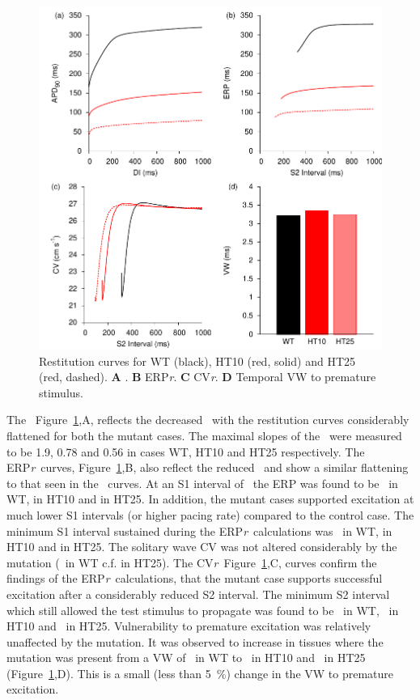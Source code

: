 \begin{figure}
\includegraphics{figures/atrium/iks/figures/03_REST}
\caption[Restitution properties with S140G mutation]{
\label{atrium:iks:apdretal}
Restitution curves for WT (black), HT10 (red, solid) and HT25 (red, dashed).
\textbf{A} \apdr.
\textbf{B} ERP\emph{r}.
\textbf{C} CV\emph{r}.
\textbf{D} Temporal VW to premature stimulus.
}
\end{figure}

The \apdr\, Figure~\ref{atrium:iks:apdretal},A, reflects the decreased \apd\ with
the restitution curves considerably flattened for both the mutant cases.
The maximal slopes of the \apdr\ were measured to be 1.9, 0.78 and 0.56 in cases
WT, HT10 and HT25 respectively.
The ERP\emph{r}\ curves, Figure~\ref{atrium:iks:apdretal},B, also reflect the
reduced \apd\ and show a similar flattening to that seen in the \apdr\ curves.
At an S1 interval of \ the ERP was found to be \ in WT,
 in HT10 and  in HT25.
In addition, the mutant cases supported excitation at much lower S1 intervals
(or higher pacing rate) compared to the control case.
The minimum S1 interval sustained during the ERP\emph{r}\ calculations was
\ in WT,  in HT10 and  in HT25.
The solitary wave CV was not altered considerably by the mutation (\
in WT c.f.  in HT25).
The CV\emph{r}\, Figure~\ref{atrium:iks:apdretal},C, curves confirm the findings
of the ERP\emph{r}\ calculations, that the mutant case supports successful
excitation after a considerably reduced S2 interval.
The minimum S2 interval which still allowed the test stimulus to propagate was
found to be \ms{317.1}\ in WT, \ms{151.7}\ in HT10 and \ms{92.5}\ in HT25.
Vulnerability to premature excitation was relatively unaffected by the mutation.
It was observed to increase in tissues where the mutation was present from a VW of
\ms{3.2}\ in WT to \ms{3.4}\ in HT10 and \ms{3.3}\ in HT25
(Figure~\ref{atrium:iks:apdretal},D).
This is a small (less than 5~\%) change in the VW to premature excitation.

